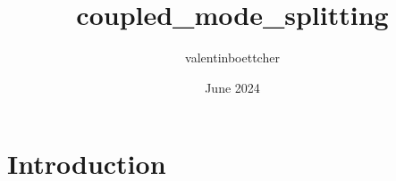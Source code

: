 \documentclass{article}
\title{coupled_mode_splitting}
\author{valentinboettcher }
\date{June 2024}
\begin{document}
\maketitle

\section{Introduction}
\end{document}
